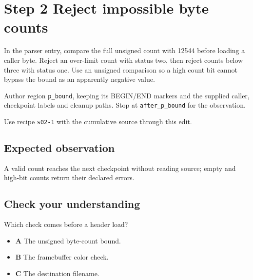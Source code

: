 \section{Step 2 Reject impossible byte counts}\label{ppm-s02}

In the parser entry, compare the full unsigned count with 12544 before loading a caller byte. Reject an over-limit count with status two, then reject counts below three with status one. Use an unsigned comparison so a high count bit cannot bypass the bound as an apparently negative value.

Author region \texttt{p\_bound}, keeping its BEGIN/END markers and the supplied caller, checkpoint labels and cleanup paths. Stop at \texttt{after\_p\_bound} for the observation.

Use recipe \texttt{s02-1} with the cumulative source through this edit.

\subsection{Expected observation}
A valid count reaches the next checkpoint without reading source; empty and high-bit counts return their declared errors.

\subsection{Check your understanding}
Which check comes before a header load?

\begin{itemize}
\item \textbf{A} The unsigned byte-count bound.
\item \textbf{B} The framebuffer color check.
\item \textbf{C} The destination filename.
\end{itemize}
